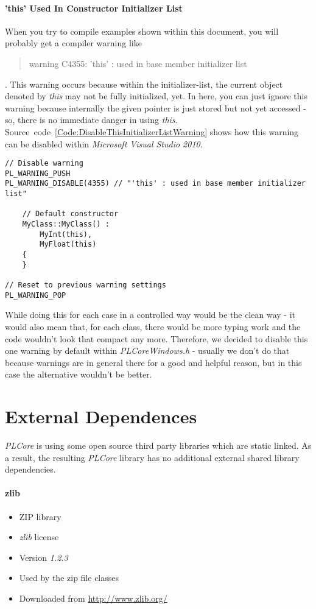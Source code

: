 \paragraph{'this' Used In Constructor Initializer List}
When you try to compile examples shown within this document, you will probably get a compiler warning like \begin{quote}warning C4355: 'this' : used in base member initializer list\end{quote}. This warning occurs because within the initializer-list, the current object denoted by \emph{this} may not be fully initialized, yet. In here, you can just ignore this warning because internally the given pointer is just stored but not yet accessed - so, there is no immediate danger in using \emph{this}. Source~code~\ref{Code:DisableThisInitializerListWarning} shows how this warning can be disabled within \emph{Microsoft Visual Studio 2010}.
\begin{lstlisting}[float=htb,label=Code:DisableThisInitializerListWarning,caption={Disable warning when using \emph{this} within the initializer list}]
// Disable warning
PL_WARNING_PUSH
PL_WARNING_DISABLE(4355) // "'this' : used in base member initializer list"

	// Default constructor
	MyClass::MyClass() :
		MyInt(this),
		MyFloat(this)
	{
	}

// Reset to previous warning settings
PL_WARNING_POP
\end{lstlisting}
While doing this for each case in a controlled way would be the clean way - it would also mean that, for each class, there would be more typing work and the code wouldn't look that compact any more. Therefore, we decided to disable this one warning by default within \emph{PLCoreWindows.h} - usually we don't do that because warnings are in general there for a good and helpful reason, but in this case the alternative wouldn't be better.




\section{External Dependences}
\emph{PLCore} is using some open source third party libraries which are static linked. As a result, the resulting \emph{PLCore} library has no additional external shared library dependencies.


\paragraph{zlib}
\begin{itemize}
\item ZIP library
\item \emph{zlib} license
\item Version \emph{1.2.3}
\item Used by the zip file classes
\item Downloaded from \url{http://www.zlib.org/}
\end{itemize}


